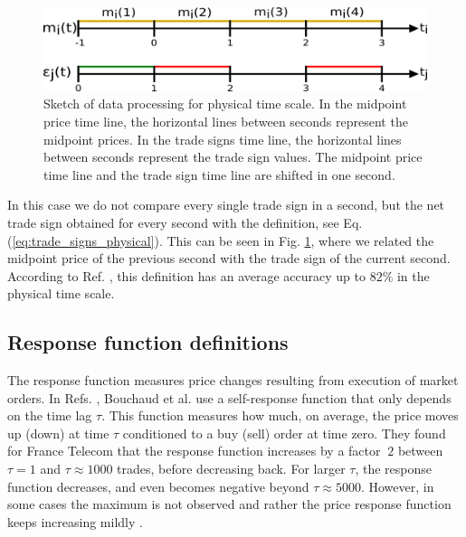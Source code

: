 \begin{figure}[htbp]
    \centering
    \includegraphics[width=\columnwidth]
    {figures/02_relation_trades_quotes_time_scale.png}
    \caption{Sketch of data processing for physical time scale. In the midpoint
             price time line, the horizontal lines between seconds represent
             the midpoint prices. In the trade signs time line, the horizontal
             lines between seconds represent the trade sign values. The
             midpoint price time line and the trade sign time line are shifted
             in one second.}
    \label{fig:relation_trades_midpoint_time_scale}
\end{figure}

In this case we do not compare every single trade sign in a second, but the net
trade sign obtained for every second with the definition, see
Eq. (\ref{eq:trade_signs_physical}). This can be seen in
Fig. \ref{fig:relation_trades_midpoint_time_scale}, where we related the
midpoint price of the previous second with the trade sign of the current
second. According to Ref. \cite{Wang_2016_cross}, this definition has an
average accuracy up to $82\%$ in the physical time scale.


\subsection{Response function definitions}\label{subsec:response_def}

The response function measures price changes resulting from execution of market
orders. In Refs.
\cite{r_walks_liquidity,subtle_nature,Bouchaud_2004}, Bouchaud et al. use a
self-response function that only depends on the time lag $\tau$. This function
measures how much, on average, the price moves up (down) at time $\tau$
conditioned to a buy (sell) order at time zero. They found for France Telecom
that the response function increases by a factor $~2$ between $\tau = 1$ and
$\tau \approx 1000$ trades, before decreasing back. For larger $\tau$, the
response function decreases, and even becomes negative beyond
$\tau \approx 5000$. However, in some cases the maximum is not observed and
rather the price response function keeps increasing mildly
\cite{subtle_nature}.

